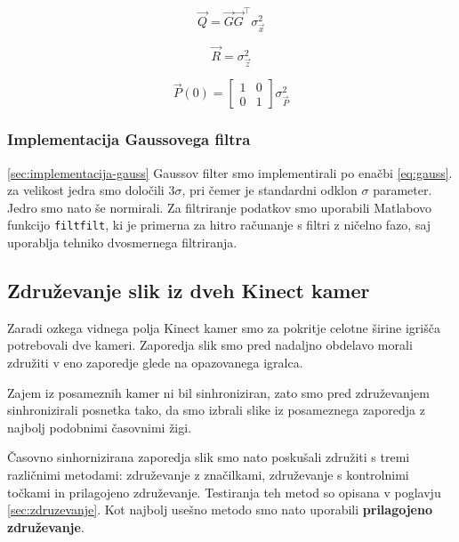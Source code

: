 \begin{equation}
\vec{Q} = \vec{G} \vec{G}^\top \sigma_\vec{x}^2
\label{eq:Q}
\end{equation}

\begin{equation}
\vec{R} = \sigma_\vec{z}^2
\label{eq:R}
\end{equation}

\begin{equation}
\vec{P}(0) = \begin{bmatrix}
1 & 0 \\
0 & 1
\end{bmatrix} \sigma_\vec{P}^2
\label{eq:P}
\end{equation}










\subsubsection{Implementacija Gaussovega filtra}\ref{sec:implementacija-gauss}
Gaussov filter smo implementirali po enačbi \eqref{eq:gauss}. za velikost jedra smo določili $3\sigma$, pri čemer je standardni odklon $\sigma$ parameter. Jedro smo nato še normirali. Za filtriranje podatkov smo uporabili Matlabovo funkcijo \texttt{filtfilt}, ki je primerna za hitro računanje s filtri z ničelno fazo, saj uporablja tehniko dvosmernega filtriranja.







\subsection{Združevanje slik iz dveh Kinect kamer}
Zaradi ozkega vidnega polja Kinect kamer smo za pokritje celotne širine igrišča potrebovali dve kameri. Zaporedja slik smo pred nadaljno obdelavo morali združiti v eno zaporedje glede na opazovanega igralca.

Zajem iz posameznih kamer ni bil sinhroniziran, zato smo pred združevanjem sinhronizirali posnetka tako, da smo izbrali slike iz posameznega zaporedja z najbolj podobnimi časovnimi žigi.

Časovno sinhornizirana zaporedja slik smo nato poskušali združiti s tremi različnimi metodami:  združevanje z značilkami, združevanje s kontrolnimi točkami in prilagojeno združevanje. Testiranja teh metod so opisana v poglavju \ref{sec:zdruzevanje}. Kot najbolj usešno metodo smo nato uporabili \textbf{prilagojeno združevanje}.

